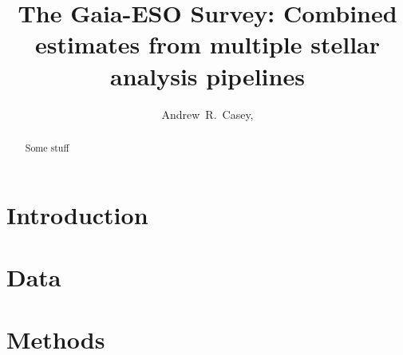 \documentclass[preprint]{aastex}
\begin{document}
\title{The Gaia-ESO Survey: Combined estimates from multiple stellar analysis pipelines}

\author{
    Andrew~R.~Casey,
   }


\begin{abstract}
  Some stuff
\end{abstract}




\section{Introduction} 
\label{sec:introduction}










\section{Data}
\label{sec:data}





\section{Methods}
\label{sec:methods}




\end{document}
